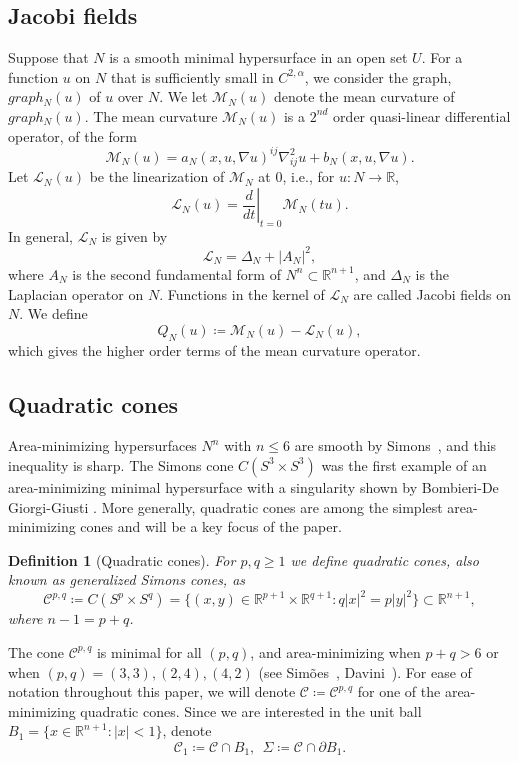 \documentclass[12pt, reqno ]{amsart}
\newtheorem{definition}[theorem]{Definition}
\numberwithin{equation}{section}
\begin{document}
\subsection{Jacobi fields}
Suppose that $N$ is a smooth minimal hypersurface in an open set $U$. For a function $u$ on $N$ that is sufficiently small in $C^{2,\alpha}$, we consider the graph, $graph_N(u)$ of $u$ over $N$. We let $\mathcal{M}_N(u)$ denote the mean curvature of $graph_N(u)$. 
The mean curvature $\mathcal{M}_N(u)$ is a $2^{nd}$ order quasi-linear differential operator, of the form
$$\mathcal{M}_N(u)=a_N(x,u,\nabla u)^{ij}\nabla^2_{ij}u+b_N(x,u,\nabla u).$$
Let $\mathcal{L}_N(u)$ be the linearization of $\mathcal{M}_N$ at $0$, i.e., for $u:N\rightarrow \mathbb R$, 
$$\left. \mathcal{L}_N(u)=\frac{d}{dt}\right |_{t=0} \mathcal{M}_N(tu) .$$  In general, $\mathcal{L}_N$ is given by 
\begin{equation}\label{L_N}
\mathcal{L}_N=\Delta_N+|A_N|^2,
\end{equation}
where $A_N$ is the second fundamental form of $N^n\subset \mathbb R^{n+1}$, and $\Delta_N$ is the Laplacian operator on $N$. Functions in the kernel of $\mathcal{L}_N$ are called Jacobi fields on $N$. We define
$$Q_N(u)\coloneqq \mathcal{M}_N(u)-\mathcal{L}_N(u),$$
which gives the higher order terms of the mean curvature operator. 

\subsection{Quadratic cones}
Area-minimizing hypersurfaces $N^n$ with $n\leq 6$ are smooth by Simons~\cite{SimonJ}, and this inequality is sharp. The Simons cone $C(S^3\times S^3)$ was the first example of an area-minimizing minimal hypersurface with a singularity shown by Bombieri-De Giorgi-Giusti \cite{Bombieri1969}. More generally, quadratic cones are among the simplest area-minimizing cones and will be a key focus of the paper. 
\begin{definition}[Quadratic cones]
\label{prel:defn:Quadratic cones}
For $p, q\geq 1$ we define quadratic cones, also known as generalized Simons cones, as 
$$\mathcal C^{p, q}\coloneqq C(S^p\times S^q)=\{(x, y)\in\mathbb R^{p+1}\times \mathbb R^{q+1}: q|x|^2=p|y|^2\}\subset \mathbb R^{n+1},$$ where $n-1=p+q$. 
\end{definition}
The cone $\mathcal C^{p, q}$ is minimal for all $(p,q)$, and area-minimizing when $p+q>6$ or when $(p,q)=(3,3), (2,4), (4,2)$ (see Sim\~oes~\cite{Simoes74}, Davini~\cite{Davini}). For ease of notation throughout this paper, we will denote $\mathcal{C}\coloneqq \mathcal C^{p,q}$ for one of the area-minimizing quadratic cones. Since we are interested in the unit ball $B_1=\{x\in \mathbb R^{n+1}: |x| <1\}$, denote 
$$\mathcal{C}_1\coloneqq \mathcal{C}\cap B_1, \:\: \Sigma\coloneqq \mathcal C\cap \partial B_1 .$$
\end{document}
